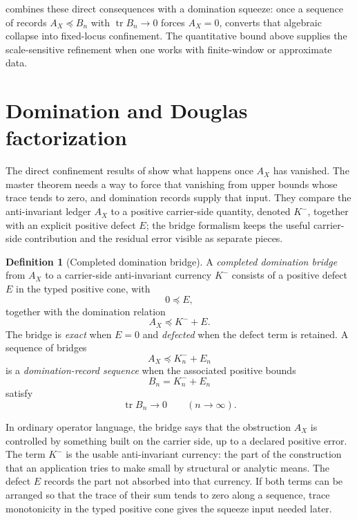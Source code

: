 \documentclass[11pt]{article}
\DeclareMathOperator{\trace}{tr}
\newcommand{\AX}{A_{X}}
\newcommand{\Kminus}{K^{-}}
\theoremstyle{definition}
\newtheorem{definition}[theorem]{Definition}
\begin{document}
 combines these direct consequences with
a domination squeeze: once a sequence of records
\(\AX\preceq B_n\) with \(\trace B_n\to0\) forces \(\AX=0\),
 converts that
algebraic collapse into fixed-locus confinement.  The quantitative
bound above supplies the scale-sensitive refinement when one works
with finite-window or approximate data.
 

\section{Domination and Douglas factorization}
\label{sec:domination}

The direct confinement results of 
show what happens once \(\AX\) has vanished.  The master theorem
needs a way to force that vanishing from upper bounds whose trace
tends to zero, and domination records supply that input.  They
compare the anti-invariant ledger \(\AX\) to a positive
carrier-side quantity, denoted \(\Kminus\), together with an
explicit positive defect \(E\); the bridge formalism keeps the
useful carrier-side contribution and the residual error visible as
separate pieces.

\begin{definition}[Completed domination bridge]
\label{def:duality_confinement:completed-domination-bridge}
A \emph{completed domination bridge} from \(\AX\) to a
carrier-side anti-invariant currency \(\Kminus\) consists of a
positive defect \(E\) in the typed positive cone, with
\[
  0\preceq E,
\]
together with the domination relation
\[
  \AX\preceq \Kminus+E.
\]
The bridge is \emph{exact} when \(E=0\) and \emph{defected} when
the defect term is retained.  A sequence of bridges
\[
  \AX\preceq \Kminus_{n}+E_n
\]
is a \emph{domination-record sequence} when the associated positive
bounds
\[
  B_n=\Kminus_{n}+E_n
\]
satisfy
\[
  \trace B_n\to0
  \qquad (n\to\infty).
\]
\end{definition}

In ordinary operator language, the bridge says that the obstruction
\(\AX\) is controlled by something built on the carrier side, up to
a declared positive error.  The term \(\Kminus\) is the usable
anti-invariant currency: the part of the construction that an
application tries to make small by structural or analytic means.
The defect \(E\) records the part not absorbed into that currency.
If both terms can be arranged so that the trace of their sum tends
to zero along a sequence, trace monotonicity in the typed positive
cone gives the squeeze input needed later.
\end{document}

